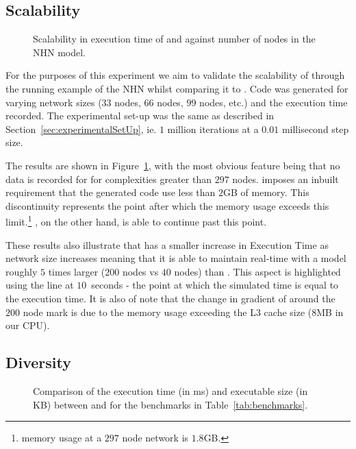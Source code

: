 \subsection{Scalability}

\begin{figure}[htbp]
  \centering
  
  \caption{Scalability in  execution time of \simulink and \ourTool against 
  number of nodes in the \acf{NHN} model.}
  \label{fig:scalability}
\end{figure}

For the purposes of this experiment we aim to validate the scalability of
\ourTool through the running example of the \ac{NHN} whilst comparing it
to \simulink.  Code was generated for varying network sizes ($33$ nodes,
$66$ nodes, $99$ nodes, etc.) and the execution time recorded.  The
experimental set-up was the same as described in
Section~\ref{sec:experimentalSetUp}, ie. $1$ million iterations at a
$0.01$ millisecond step size.

The results are shown in Figure~\ref{fig:scalability}, with the most
obvious feature being that no data is recorded for \simulink for
complexities greater than $297$ nodes.  \simulink imposes an inbuilt
requirement that the generated code use less than $2$GB of memory. This
discontinuity represents the point after which the memory usage exceeds
this limit.\footnote{\simulink memory usage at a $297$ node network is 
$1.8$GB.}  \ourTool, on the other hand, is able to continue past this
point.

These results also illustrate that \ourTool has a smaller increase in
Execution Time as network size increases meaning that it is able to
maintain real-time with a model roughly $5$ times larger ($200$ nodes vs
$40$ nodes) than \simulink.  This aspect is highlighted using the line at 
$10$~seconds - the point at which the simulated time is equal to the execution 
time.  It is also of note that the change in gradient of \ourTool around the 
$200$ node mark is due to the memory usage exceeding the L$3$ cache size ($8$MB 
in our CPU).


\subsection{Diversity}
\label{sec:diversity}

\begin{figure}[htbp]
  \centering
  \caption{Comparison of the execution time (in ms) and executable size
    (in KB) between \simulink and \ourTool for the benchmarks in
    Table~\ref{tab:benchmarks}.}
  \label{fig:results}
\end{figure}

